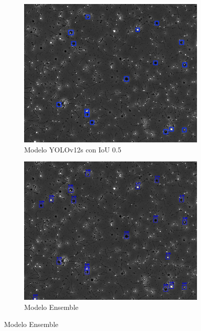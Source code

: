 \documentclass[12pt,a4paper,onecolumn,oneside]{report}
\begin{document}
\begin{figure}[H]
  \vspace{0.3cm} 
  
  \begin{subfigure}[b]{0.48\textwidth}
    \centering
    \includegraphics[width=\textwidth]{figuras/evaluacion_cualitativa/139/139_v12.jpg}
    \caption{Modelo YOLOv12s con IoU 0.5}
    \label{fig:yolov12s_IoU0.5_image_139}
  \end{subfigure}
  \hfill
  \begin{subfigure}[b]{0.48\textwidth}
    \centering
    \includegraphics[width=\textwidth]{figuras/evaluacion_cualitativa/139/139_ensemble.jpg}
    \caption{Modelo Ensemble}
    \label{fig:ensemble_image_139}
  \end{subfigure}


\end{figure}
\end{document}
